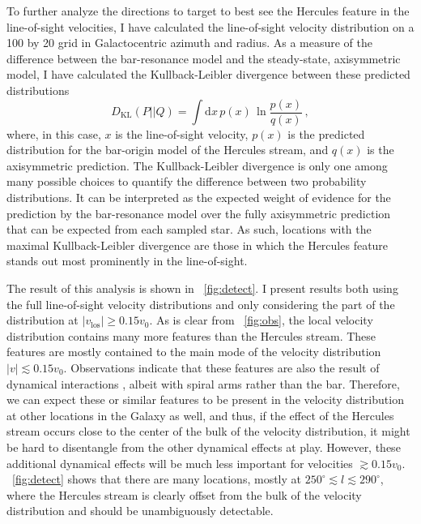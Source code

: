 \documentclass[12pt,preprint]{aastex}
\newcommand{\eg}{e.g.}
\newcommand{\dd}{\mathrm{d}}
\newcommand{\vo}{\ensuremath{v_0}}
\begin{document}
To further analyze the directions to target to best see the Hercules
feature in the line-of-sight velocities, I have calculated the
line-of-sight velocity distribution on a 100 by 20 grid in
Galactocentric azimuth and radius. As a measure of the difference
between the bar-resonance model and the steady-state, axisymmetric
model, I have calculated the Kullback-Leibler divergence between these
predicted distributions \citep[\eg,][]{mackay}
\begin{equation}
D_{\text{KL}}(P||Q) = \int \dd x\,p(x)\,\ln \frac{p(x)}{q(x)}\,,
\end{equation}
where, in this case, $x$ is the line-of-sight velocity, $p(x)$ is the
predicted distribution for the bar-origin model of the Hercules
stream, and $q(x)$ is the axisymmetric prediction. The
Kullback-Leibler divergence is only one among many possible choices to
quantify the difference between two probability distributions. It can
be interpreted as the expected weight of evidence for the prediction
by the bar-resonance model over the fully axisymmetric prediction that
can be expected from each sampled star. As such, locations with the
maximal Kullback-Leibler divergence are those in which the Hercules
feature stands out most prominently in the line-of-sight.

The result of this analysis is shown in
\figurename~\ref{fig:detect}. I present results both using the full
line-of-sight velocity distributions and only considering the part of
the distribution at $|v_{\text{los}}| \geq 0.15 \vo$. As is clear from
\figurename~\ref{fig:obs}, the local velocity distribution contains
many more features than the Hercules stream. These features are mostly
contained to the main mode of the velocity distribution $|v| \lesssim
0.15 \vo$. Observations indicate that these features are also the
result of dynamical interactions \citep[\eg,][]{Bovy10a,sellwood10a},
albeit with spiral arms rather than the bar. Therefore, we can expect
these or similar features to be present in the velocity distribution
at other locations in the Galaxy as well, and thus, if the effect of
the Hercules stream occurs close to the center of the bulk of the
velocity distribution, it might be hard to disentangle from the other
dynamical effects at play. However, these additional dynamical effects
will be much less important for velocities $\gtrsim 0.15
\vo$. \figurename~\ref{fig:detect} shows that there are many
locations, mostly at $250^{\circ} \lesssim l \lesssim 290^{\circ}$,
where the Hercules stream is clearly offset from the bulk of the
velocity distribution and should be unambiguously detectable.
\end{document}
